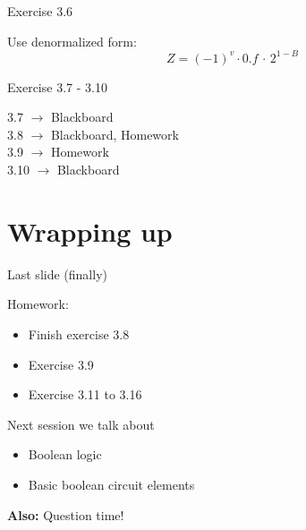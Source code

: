 \documentclass[11pt]{tudbeamer}
\begin{document}
\begin{frame}{Exercise 3.6}

	Use denormalized form:
	$$Z = (-1)^v \cdot 0.f\, \cdot \, 2^{1-B}$$

\end{frame}

\begin{frame}{Exercise 3.7 - 3.10}
	
	3.7 $\rightarrow$ Blackboard\\
	3.8 $\rightarrow$ Blackboard, Homework\\
	3.9 $\rightarrow$ Homework\\
	3.10 $\rightarrow$ Blackboard

\end{frame}

\section{Wrapping up}

\begin{frame}{Last slide (finally)}

	Homework:
	\begin{itemize}
		\item Finish exercise 3.8
		\item Exercise 3.9
		\item Exercise 3.11 to 3.16
	\end{itemize}
	\vspace{1em}
	
	Next session we talk about
	\begin{itemize}
		\item Boolean logic
		\item Basic boolean circuit elements
	\end{itemize} 
	\vspace{1em}
	\textbf{Also:} Question time!

\end{frame}
\end{document}
